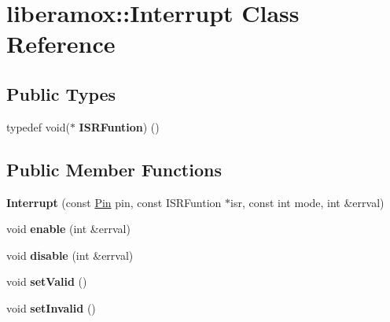 \hypertarget{classliberamox_1_1Interrupt}{}\section{liberamox\+:\+:Interrupt Class Reference}
\label{classliberamox_1_1Interrupt}
\subsection*{Public Types}
\begin{DoxyCompactItemize}
\item 
typedef void($\ast$ {\bfseries I\+S\+R\+Funtion}) ()\hypertarget{classliberamox_1_1Interrupt_afd675f33f9feb88ba280b01a794911c9}{}\label{classliberamox_1_1Interrupt_afd675f33f9feb88ba280b01a794911c9}

\end{DoxyCompactItemize}
\subsection*{Public Member Functions}
\begin{DoxyCompactItemize}
\item 
{\bfseries Interrupt} (const \hyperlink{classliberamox_1_1Pin}{Pin} pin, const I\+S\+R\+Funtion $\ast$isr, const int mode, int \&errval)\hypertarget{classliberamox_1_1Interrupt_a0479839f342e75ebe1bd379f9d54741e}{}\label{classliberamox_1_1Interrupt_a0479839f342e75ebe1bd379f9d54741e}

\item 
void {\bfseries enable} (int \&errval)\hypertarget{classliberamox_1_1Interrupt_ab8148e27ca9a50e98b291b2909a2df08}{}\label{classliberamox_1_1Interrupt_ab8148e27ca9a50e98b291b2909a2df08}

\item 
void {\bfseries disable} (int \&errval)\hypertarget{classliberamox_1_1Interrupt_a2b533ca115c7488e69ef2b041dfbcd95}{}\label{classliberamox_1_1Interrupt_a2b533ca115c7488e69ef2b041dfbcd95}

\item 
void {\bfseries set\+Valid} ()\hypertarget{classliberamox_1_1Interrupt_a2030477440fd97e9c8bf39014e359cca}{}\label{classliberamox_1_1Interrupt_a2030477440fd97e9c8bf39014e359cca}

\item 
void {\bfseries set\+Invalid} ()\hypertarget{classliberamox_1_1Interrupt_a021a8f5bc2257558b294eb1b0e41cdc4}{}\label{classliberamox_1_1Interrupt_a021a8f5bc2257558b294eb1b0e41cdc4}

\end{DoxyCompactItemize}
